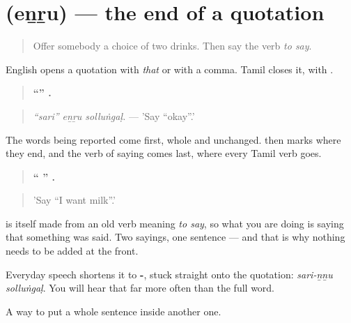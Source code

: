 \section[\texorpdfstring{\ta{என்று} (eṉṟu)}{என்று (eṉṟu)}]{ (eṉṟu) — the end of a quotation}

\label{lesson:TA-C77-quotative}



\begin{quote}
Offer somebody a choice of two drinks. Then say the verb \emph{to say}.
\end{quote}

\begin{grammarlens}[title={Grammar lens: the quotation carries its own closing word}]
English opens a quotation with \emph{that} or with a comma. Tamil closes it, with \textbf{}.

\begin{quote}
\textbf{\textquotedblleft{}\textquotedblright{}  .}
\end{quote}

\begin{quote}
\emph{\textquotedblleft{}sari\textquotedblright{} eṉṟu solluṅgaḷ.} — 'Say \textquotedblleft{}okay\textquotedblright{}.'
\end{quote}

The words being reported come first, whole and unchanged. \textbf{} then marks where they end, and the verb of saying comes last, where every Tamil verb goes.

\begin{quote}
\textbf{\textquotedblleft{} \textquotedblright{}  .}
\end{quote}

\begin{quote}
'Say \textquotedblleft{}I want milk\textquotedblright{}.'
\end{quote}

 is itself made from an old verb meaning \emph{to say}, so what you are doing is saying that something was said. Two sayings, one sentence — and that is why nothing needs to be added at the front.

Everyday speech shortens it to \textbf{-}, stuck straight onto the quotation: \emph{sari-ṉṉu solluṅgaḷ}. You will hear that far more often than the full word.
\end{grammarlens}

\begin{grammarlens}[title={What you've built}]
A way to put a whole sentence inside another one.
\end{grammarlens}

